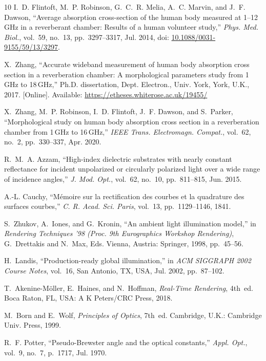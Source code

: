 \documentclass[journal,twocolumn,10pt]{IEEEtran}
\newcommand*{\doi}[1]{\href{https://doi.org/#1}{#1}}
\theoremstyle{plain}
\begin{document}
\begin{thebibliography}{10}
I.~D. Flintoft, M.~P. Robinson, G.~C.~R. Melia, A.~C. Marvin, and
  J.~F. Dawson, ``Average absorption cross-section of the human body
  measured at 1--12\,GHz in a reverberant chamber: Results of a human
  volunteer study,'' \emph{Phys. Med. Biol.}, vol.~59, no.~13,
  pp.~3297--3317, Jul. 2014, doi: \doi{10.1088/0031-9155/59/13/3297}.

X.~Zhang, ``Accurate wideband measurement of human body absorption cross
  section in a reverberation chamber: A morphological parameters study
  from 1\,GHz to 18\,GHz,'' Ph.D. dissertation, Dept. Electron., Univ.
  York, York, U.K., 2017. [Online]. Available:
  \url{https://etheses.whiterose.ac.uk/19455/}

X.~Zhang, M.~P. Robinson, I.~D. Flintoft, J.~F. Dawson, and S.~Parker,
  ``Morphological study on human body absorption cross section in a
  reverberation chamber from 1\,GHz to 16\,GHz,'' \emph{IEEE Trans.
  Electromagn. Compat.}, vol.~62, no.~2, pp.~330--337, Apr. 2020.

R.~M.~A. Azzam, ``High-index dielectric substrates with nearly constant
  reflectance for incident unpolarized or circularly polarized light over
  a wide range of incidence angles,'' \emph{J. Mod. Opt.}, vol.~62,
  no.~10, pp.~811--815, Jun. 2015.

A.-L. Cauchy, ``M\'emoire sur la rectification des courbes et la
  quadrature des surfaces courbes,'' \emph{C. R. Acad. Sci. Paris},
  vol.~13, pp.~1129--1146, 1841.

S.~Zhukov, A.~Iones, and G.~Kronin, ``An ambient light illumination
  model,'' in \emph{Rendering Techniques '98 (Proc. 9th Eurographics
  Workshop Rendering)}, G.~Drettakis and N.~Max, Eds.
  Vienna, Austria: Springer, 1998, pp.~45--56.

H.~Landis, ``Production-ready global illumination,'' in \emph{ACM
  SIGGRAPH 2002 Course Notes}, vol.~16, San Antonio, TX, USA, Jul. 2002,
  pp.~87--102.

T.~Akenine-M{\"o}ller, E.~Haines, and N.~Hoffman, \emph{Real-Time
  Rendering}, 4th~ed. Boca Raton, FL, USA: A K Peters/CRC Press,
  2018.

M.~Born and E.~Wolf, \emph{Principles of Optics}, 7th~ed.
  Cambridge, U.K.: Cambridge Univ. Press, 1999.

R.~F. Potter, ``Pseudo-Brewster angle and the optical constants,''
  \emph{Appl. Opt.}, vol.~9, no.~7, p.~1717, Jul. 1970.


\end{thebibliography}
\end{document}
